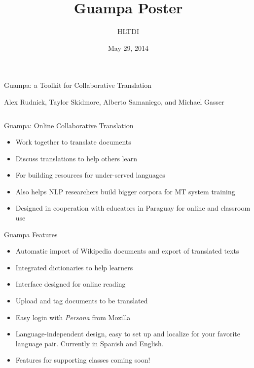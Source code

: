 \documentclass[final]{beamer}
\title{Guampa Poster}
\author{HLTDI}
\institute[Indiana University]{School of Informatics and Computing, Indiana University}
\date{May 29, 2014}
\begin{document}
\begin{frame}{} 
  \begin{block}
    {\centering \Huge Guampa: a Toolkit for Collaborative Translation}\par
    \centering
    {\large Alex Rudnick, Taylor Skidmore, Alberto Samaniego, and Michael Gasser}
    \par
  \end{block}

\begin{columns}[t]

  \begin{column}{.32\linewidth}

  \vfill
  \begin{block}{\large Guampa: Online Collaborative Translation}
    \centering
    \begin{itemize}
    \item Work together to translate documents
    \item Discuss translations to help others learn
    \item For building resources for under-served languages
    \item Also helps NLP researchers build bigger corpora for MT system training
    \item Designed in cooperation with educators in Paraguay for online and
    classroom use
    \end{itemize}
  \end{block}

  \begin{block}{\large Guampa Features}
    \centering
    \begin{itemize}
    \item Automatic import of Wikipedia documents and export of translated texts
    \item Integrated dictionaries to help learners
    \item Interface designed for online reading
    \item Upload and tag documents to be translated
    \item Easy login with \emph{Persona} from Mozilla
    \item Language-independent design, easy to set up and localize for your
    favorite language pair. Currently in Spanish and English.
    \item Features for supporting classes coming soon!
    \end{itemize}
  \end{block}
  \centering


\end{column}
\end{columns}
\end{frame}
\end{document}
